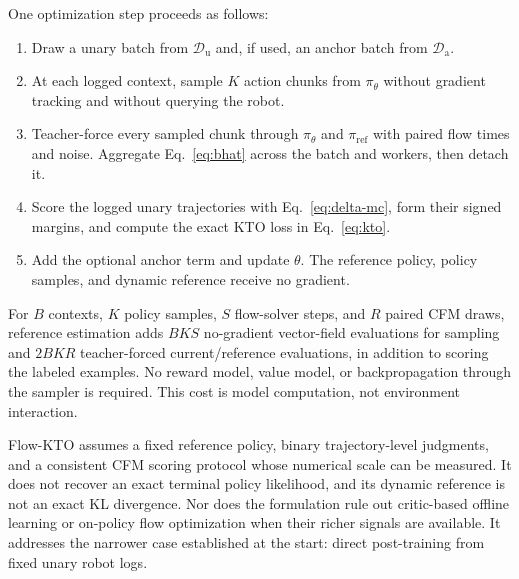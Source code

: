 \documentclass[10pt]{article}
\newcommand{\Dunary}{\mathcal{D}_{\mathrm{u}}}
\newcommand{\Danchor}{\mathcal{D}_{\mathrm{a}}}
\begin{document}
One optimization step proceeds as follows:
\begin{enumerate}
    \item Draw a unary batch from $\Dunary$ and, if used, an anchor batch from
    $\Danchor$.
    \item At each logged context, sample $K$ action chunks from
    $\pi_\theta$ without gradient tracking and without querying the robot.
    \item Teacher-force every sampled chunk through $\pi_\theta$ and
    $\pi_{\mathrm{ref}}$ with paired flow times and noise. Aggregate
    Eq.~\eqref{eq:bhat} across the batch and workers, then detach it.
    \item Score the logged unary trajectories with Eq.~\eqref{eq:delta-mc},
    form their signed margins, and compute the exact KTO loss in
    Eq.~\eqref{eq:kto}.
    \item Add the optional anchor term and update $\theta$. The reference
    policy, policy samples, and dynamic reference receive no gradient.
\end{enumerate}

For $B$ contexts, $K$ policy samples, $S$ flow-solver steps, and $R$ paired
CFM draws, reference estimation adds $BKS$ no-gradient vector-field evaluations
for sampling and $2BKR$ teacher-forced current/reference evaluations, in
addition to scoring the labeled examples. No reward model, value model, or
backpropagation through the sampler is required. This cost is model computation,
not environment interaction.

Flow-KTO assumes a fixed reference policy, binary trajectory-level judgments,
and a consistent CFM scoring protocol whose numerical scale can be measured.
It does not recover an exact terminal policy likelihood, and its dynamic
reference is not an exact KL divergence. Nor does the formulation rule out
critic-based offline learning or on-policy flow optimization when their richer
signals are available. It addresses the narrower case established at the
start: direct post-training from fixed unary robot logs.



\end{document}
